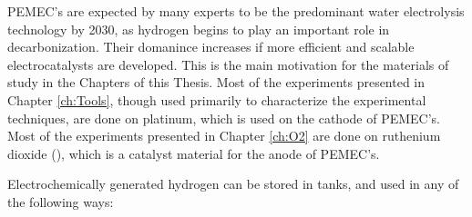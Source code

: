 PEMEC's are expected by many experts to be the predominant water electrolysis technology by 2030, as hydrogen begins to play an important role in decarbonization\cite{Schmidt2017}. Their domanince increases if more efficient and scalable electrocatalysts are developed. This is the main motivation for the materials of study in the Chapters of this Thesis. Most of the experiments presented in Chapter \ref{ch:Tools}, though used primarily to characterize the experimental techniques, are done on platinum, which is used on the cathode of PEMEC's. Most of the experiments presented in Chapter \ref{ch:O2} are done on ruthenium dioxide (), which is a catalyst material for the anode of PEMEC's.

\vspace{5mm}
Electrochemically generated hydrogen can be stored in tanks, and used in any of the following ways:
